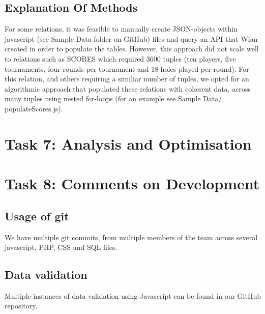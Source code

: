\documentclass[titlepage]{article}
\begin{document}
\subsection{Explanation Of Methods}
\vspace{1em}
For some relations, it was feasible to manually create JSON-objects within javascript (see Sample Data folder on GitHub) files and query an API that Wian
created in order to populate the tables. However, this approach did not scale well to relations such as SCORES which required
3600 tuples (ten players, five tournaments, four rounds per tournament and 18 holes played per round). For this relation,
and others requiring a similiar number of tuples, we opted for an algorithmic approach that populated these relations with 
coherent data, across many tuples using nested for-loops (for an example see Sample Data/ populateScores.js).

\newpage



\section{Task 7: Analysis and Optimisation}
\newpage


\section{Task 8: Comments on Development}

\subsection{Usage of git}
We have multiple git commits, from multiple members of the team across several javascript, PHP, CSS and SQL files.

\subsection{Data validation}
Multiple instances of data validation using Javascript can be found in our GitHub repository.
\end{document}

